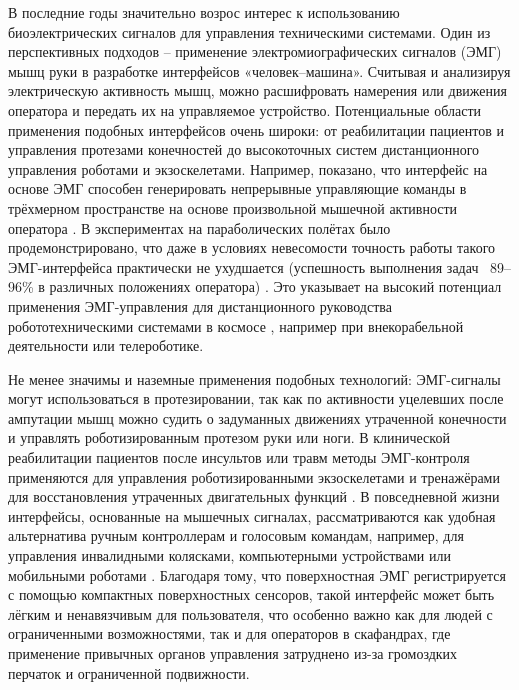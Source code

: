 \documentclass[12pt,a4paper]{article}
\begin{document}
В последние годы значительно возрос интерес к использованию биоэлектрических сигналов для управления техническими системами. Один из перспективных подходов -- применение электромиографических сигналов (ЭМГ) мышц руки в разработке интерфейсов «человек--машина». Считывая и анализируя электрическую активность мышц, можно расшифровать намерения или движения оператора и передать их на управляемое устройство. Потенциальные области применения подобных интерфейсов очень широки: от реабилитации пациентов и управления протезами конечностей до высокоточных систем дистанционного управления роботами и экзоскелетами. Например, показано, что интерфейс на основе ЭМГ способен генерировать непрерывные управляющие команды в трёхмерном пространстве на основе произвольной мышечной активности оператора \cite{1}. В экспериментах на параболических полётах было продемонстрировано, что даже в условиях невесомости точность работы такого ЭМГ-интерфейса практически не ухудшается (успешность выполнения задач ~89–96\% в различных положениях оператора) \cite{1, 2}. Это указывает на высокий потенциал применения ЭМГ-управления для дистанционного руководства робототехническими системами в космосе  
, например при внекорабельной деятельности или телероботике.


Не менее значимы и наземные применения подобных технологий: ЭМГ-сигналы могут использоваться в протезировании, так как по активности уцелевших после ампутации мышц можно судить о задуманных движениях утраченной конечности и управлять роботизированным протезом руки или ноги. \cite{3,4} В клинической реабилитации пациентов после инсультов или травм методы ЭМГ-контроля применяются для управления роботизированными экзоскелетами и тренажёрами для восстановления утраченных двигательных функций \cite{5}. В повседневной жизни интерфейсы, основанные на мышечных сигналах, рассматриваются как удобная альтернатива ручным контроллерам и голосовым командам, например, для управления инвалидными колясками, компьютерными устройствами или мобильными роботами \cite{6,7}.
Благодаря тому, что поверхностная ЭМГ регистрируется с помощью компактных поверхностных сенсоров, такой интерфейс может быть лёгким и ненавязчивым для пользователя, что особенно важно как для людей с ограниченными возможностями, так и для операторов в скафандрах, где применение привычных органов управления затруднено из-за громоздких перчаток и ограниченной подвижности.
\end{document}
